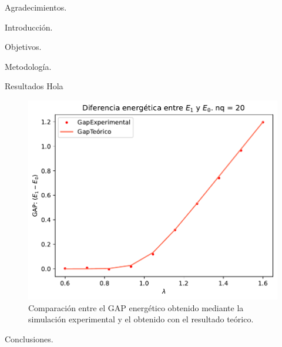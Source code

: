 \begin{section}{Agradecimientos.}
    
\end{section}
\begin{section}{Introducción.}


\end{section}

\begin{section}{Objetivos.}
    
\end{section}
\begin{section}{Metodología.}
    
\end{section}



\begin{section}{Resultados}
Hola


\begin{figure}[H]
    \includegraphics[scale = 1]{figures/GAP_20N_0.60-1.60.pdf}
    \caption{Comparación entre el GAP energético obtenido mediante la simulación experimental
    y el obtenido con el resultado teórico.}   
\end{figure}

\end{section}

\begin{section}{Conclusiones.}
    
\end{section}